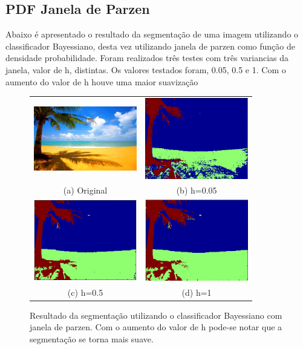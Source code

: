 \documentclass[ 
	article,			%
	11pt,				%
	oneside,			%
	a4paper,			%
	english,			%
	brazil,				%
	]{abntex2}
\begin{document}
\subsection{PDF Janela de Parzen}
Abaixo é apresentado o resultado da segmentação de uma imagem utilizando o
classificador Bayessiano, desta vez utilizando janela de parzen como função de
densidade probabilidade. Foram realizados três testes com três variancias da
janela, valor de h, distintas. Os valores testados foram, 0.05, 0.5 e 1. Com o
aumento do valor de h houve uma maior suavização


\begin{figure}
	\centering
	\begin{tabular}{cc}
	  \includegraphics[width=45mm]{matlab/figura/gauss/segmentacao/paradise.jpg} & 
	  \includegraphics[width=45mm]{matlab/figura/parzen/segmentacao/paradiseRes.png}
	  \\ 
	  (a) Original & (b) h=0.05\\
	  \includegraphics[width=45mm]{matlab/figura/parzen/segmentacao/paradiseRes05.png} & 
	  \includegraphics[width=45mm]{matlab/figura/parzen/segmentacao/paradiseRes1.png}
	   \\
	  (c) h=0.5 & (d) h=1\\
	\end{tabular}
	\caption{Resultado da segmentação utilizando o classificador Bayessiano com
	janela de parzen.
	Com o aumento do valor de h pode-se notar que a segmentação se torna mais
	suave.}
	\label{fig:resultGaussSegParadise}
\end{figure}
\end{document}
